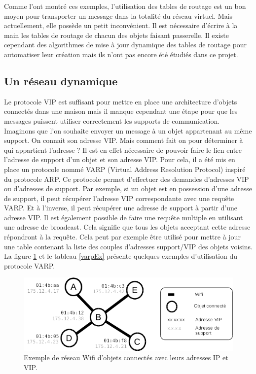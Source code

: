 			Comme l'ont montré ces exemples, l'utilisation des tables de routage est un bon moyen pour
			transporter un message dans la totalité du réseau virtuel. Mais actuellement, elle possède
			un petit inconvénient. Il est nécessaire d'écrire à la main les tables de routage de 
			chacun des objets faisant passerelle. Il existe cependant des algorithmes de mise à jour 
			dynamique des tables de routage pour automatiser leur création mais ils n'ont pas encore 
			été étudiés dans ce projet.

	\subsection{Un réseau dynamique}
		Le protocole VIP est suffisant pour mettre en place une architecture d'objets connectés dans
		une maison mais il manque cependant une étape pour que les messages puissent utiliser
		correctement les supports de communication. Imaginons que l'on souhaite envoyer un message 
		à un objet appartenant au même support. On connait son adresse VIP. Mais comment 
		fait on pour déterminer à qui appartient l'adresse ? Il est en effet nécessaire de pouvoir 
		faire le lien entre l'adresse de support d'un objet et son adresse VIP. Pour cela, il a été
		mis en place un protocole nommé VARP (Virtual Address Resolution Protocol) inspiré du
		protocole ARP. Ce protocole permet d'effectuer des demandes d'adresses VIP ou d'adresses de
		support. Par exemple, si un objet est en possession d'une adresse de support, il peut
		récupérer l'adresse VIP correspondante avec une requête VARP. Et à l'inverse, il peut
		récupérer une adresse de support à partir d'une adresse VIP. Il est également possible de
		faire une requête multiple en utilisant une adresse de broadcast. Cela signifie que tous les
		objets acceptant cette adresse répondront à la requête. Cela peut par exemple être utilisé
		pour mettre à jour une table contenant la liste des couples d'adresses support/VIP des objets
		voisins. La figure \ref{varpNet} et le tableau \ref{varpEx} présente quelques exemples 
		d'utilisation du protocole VARP.
		
		\begin{figure}[!ht]
			\centering
			\includegraphics[width=\textwidth]{img/varp_net.png}
			\caption{Exemple de réseau Wifi d'objets connectés avec leurs adresses IP et VIP.}
			\label{varpNet}
		\end{figure}
		
